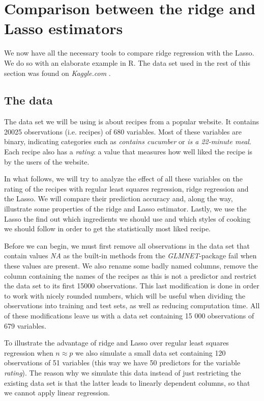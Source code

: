 \section{Comparison between the ridge and Lasso estimators} \label{sec:5.CRL}
We now have all the necessary tools to compare ridge regression with the Lasso. We do so with an elaborate example in R. The data set used in the rest of this section was found on \textit{Kaggle.com} \cite{EpiR}.

\subsection{The data}
The data set we will be using is about recipes from a popular website. It contains \num{20 025} observations (i.e. recipes) of \num{680} variables. Most of these variables are binary, indicating categories such as \textit{contains cucumber} or \textit{is a 22-minute meal}. Each recipe also has a \textit{rating}: a value that measures how well liked the recipe is by the users of the website.

In what follows, we will try to analyze the effect of all these variables on the rating of the recipes with regular least squares regression, ridge regression and the Lasso. We will compare their prediction accuracy and, along the way, illustrate some properties of the ridge and Lasso estimator. Lastly, we use the Lasso the find out which ingredients we should use and which styles of cooking we should follow in order to get the statistically most liked recipe.

Before we can begin, we must first remove all observations in the data set that contain values \textit{NA} as the built-in methods from the \textit{GLMNET}-package fail when these values are present. We also rename some badly named columns, remove the column containing the names of the recipes as this is not a predictor and restrict the data set to its first \num{15 000} observations. This last modification is done in order to work with nicely rounded numbers, which will be useful when dividing the observations into training and test sets, as well as reducing computation time. All of these modifications leave us with a data set containing 15 000 observations of 679 variables.

To illustrate the advantage of ridge and Lasso over regular least squares regression when $n \approx p$ we also simulate a small data set containing 120 observations of 51 variables (this way we have 50 predictors for the variable \textit{rating}). The reason why we simulate this data instead of just restricting the existing data set is that the latter leads to linearly dependent columns, so that we cannot apply linear regression.

